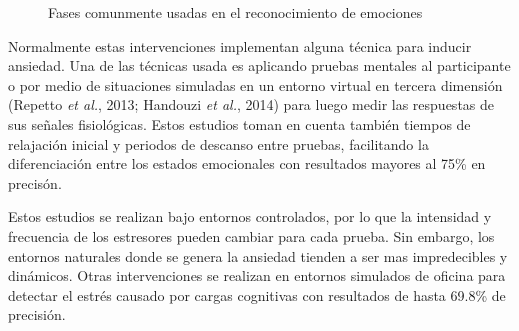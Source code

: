 \begin{figure}[h]
	\centering
	\caption{Fases comunmente usadas en el reconocimiento de emociones} \label{fig:anxiDetection}
\end{figure}

Normalmente estas intervenciones implementan alguna t\'ecnica para inducir ansiedad. Una de las t\'ecnicas usada es aplicando pruebas mentales al participante \citep{rani2007anxiety} o por medio de situaciones simuladas en un entorno virtual en tercera dimensi\'on (Repetto \textit{et al.}, 2013; Handouzi \textit{et al.}, 2014) para luego medir las respuestas de sus se\~nales fisiol\'ogicas. Estos estudios toman en cuenta tambi\'en tiempos de relajaci\'on inicial y periodos de descanso entre pruebas, facilitando la diferenciaci\'on entre los estados emocionales con resultados mayores al 75\% en precis\'on.

Estos estudios se realizan bajo entornos controlados, por lo que la intensidad y frecuencia de los estresores pueden cambiar para cada prueba. Sin embargo, los entornos naturales donde se genera la ansiedad tienden a ser mas impredecibles y din\'amicos. Otras intervenciones se realizan en entornos simulados de oficina para detectar el estr\'es causado por cargas cognitivas \citep{Cinaz13} con resultados de hasta 69.8\% de precisi\'on.

